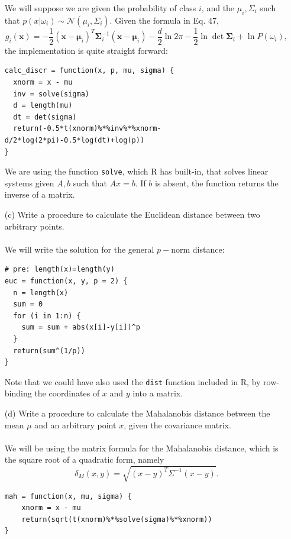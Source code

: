 \documentclass[10pt]{article}
\begin{document}
\begin{enumerate}
\normalsize
        We will suppose we are given the probability of class $i$, and the $\mu_i,\Sigma_i$ such that $p(x|\omega_i)\sim\mathcal N(\mu_i,\Sigma_i)$. Given the formula in Eq. 47,
        \[
g_i(\boldsymbol x)=-\frac{1}{2}(\boldsymbol x-\boldsymbol\mu_i)^T\boldsymbol\Sigma_i^{-1}(\boldsymbol x-\boldsymbol\mu_i)-\frac{d}{2}\ln{2\pi}-\frac{1}{2}\ln{\det{\boldsymbol\Sigma_i}}+\ln{P(\omega_i)},
        \]
        the implementation is quite straight forward:
        \begin{verbatim}
calc_discr = function(x, p, mu, sigma) {
  xnorm = x - mu
  inv = solve(sigma)
  d = length(mu)
  dt = det(sigma)
  return(-0.5*t(xnorm)%*%inv%*%xnorm-d/2*log(2*pi)-0.5*log(dt)+log(p))
}
        \end{verbatim}
        We are using the function \verb|solve|, which R has built-in, that solves linear systems given $A,b$ such that $Ax=b$. If $b$ is absent, the function returns the inverse of a matrix.
\Large
    \item[(c)] Write a procedure to calculate the Euclidean distance between two arbitrary points.\\ \ \\
\normalsize
        We will write the solution for the general $p-$norm distance:
        \begin{verbatim}
# pre: length(x)=length(y)
euc = function(x, y, p = 2) {
  n = length(x)
  sum = 0
  for (i in 1:n) {
    sum = sum + abs(x[i]-y[i])^p
  }
  return(sum^(1/p))
}
        \end{verbatim}
        Note that we could have also used the \verb|dist| function included in R, by row-binding the coordinates of $x$ and $y$ into a matrix.\\
        
\Large
    \item[(d)] Write a procedure to calculate the Mahalanobis distance between the mean $\mu$ and an arbitrary point $x$, given the covariance matrix.\\ \ \\
\normalsize
        We will be using the matrix formula for the Mahalanobis distance, which is the square root of a quadratic form, namely
        \[
        \delta_M(x,y)=\sqrt{(x-y)^T\Sigma^{-1}(x-y)}.
        \]
        \begin{verbatim}
mah = function(x, mu, sigma) {
    xnorm = x - mu
    return(sqrt(t(xnorm)%*%solve(sigma)%*%xnorm))
}
        \end{verbatim}
  \end{enumerate}
\end{document}
